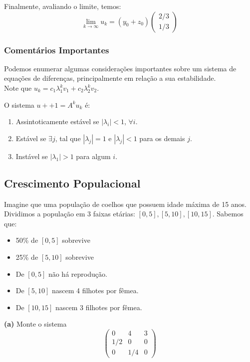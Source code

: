 \documentclass[12pt]{article}
\begin{document}
Finalmente, avaliando o limite, temos:
\begin{equation*}
	\lim_{k\to\infty}u_{k}=(y_0+z_0)\begin{pmatrix}
		2/3 \\
		1/3
	\end{pmatrix}
\end{equation*}

\subsubsection{Comentários Importantes}

Podemos enumerar algumas considerações importantes sobre um sistema de equações de diferenças, principalmente em relação a sua estabilidade.\\

Note que $u_k=c_1\lambda_1^kv_1+c_2\lambda_2^kv_2$.

O sistema $u+{+1}=A^ku_k$ é:
\begin{enumerate}
	\item Assintoticamente estável se $|\lambda_i|<1$, $\forall i$.
	\item Estável se $\exists j$, tal que $|\lambda_j|=1$ e $|\lambda_j|<1$ para os demais $j$.
	\item Instável se $|\lambda_1|>1$ para algum $i$.
\end{enumerate}

\subsection{Crescimento Populacional}

Imagine que uma população de coelhos que possuem idade máxima de 15 anos. Dividimos a população em 3 faixas etárias: $[0,5],[5,10],[10,15]$. Sabemos que:
\begin{itemize}
	\item 50\% de $[0,5]$ sobrevive
	\item 25\% de $[5,10]$ sobrevive
	\item De $[0,5]$ não há reprodução.
	\item De $[5,10]$ nascem 4 filhotes por fêmea.
	\item De $[10,15]$ nascem 3 filhotes por fêmea.
\end{itemize}

\textbf{(a)} Monte o sistema\\

\begin{equation*}
	\begin{pmatrix}
		0 & 4 & 3 \\
		1/2 & 0 & 0 \\
		0 & 1/4 & 0
	\end{pmatrix}
\end{equation*}
\end{document}
